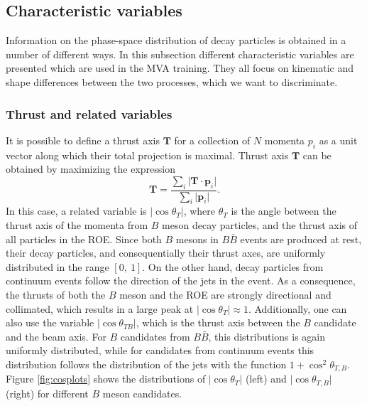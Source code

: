\subsection{Characteristic variables}
\label{ss:charvar}
Information on the phase-space distribution of decay particles is obtained in a number of different ways. In this subsection different characteristic variables are presented which are used in the MVA training. They all focus on kinematic and shape differences between the two processes, which we want to discriminate. 


\subsubsection{Thrust and related variables}
It is possible to define a thrust axis $\mathbf{T}$ for a collection of $N$ momenta $p_i$ as a unit vector along which their total projection is maximal. Thrust axis $\mathbf T$ can be obtained by maximizing the expression
\begin{equation}
\mathbf{T} = \frac{\sum_{i}\vert \mathbf{T} \cdot \mathbf{p}_i\vert}{\sum_{i}\vert \mathbf{p}_i\vert}.
\end{equation}
In this case, a related variable is $\vert \cos\theta_T\vert$, where $\theta_T$ is the angle between the thrust axis of the momenta from $B$ meson decay particles, and the thrust axis of all particles in the ROE. Since both $B$ mesons in $B \bar B$ events are produced at rest, their decay particles, and consequentially their thrust axes, are uniformly distributed in the range $[0,~1]$. On the other hand, decay particles from continuum events follow the direction of the jets in the event. As a consequence, the thrusts of both the $B$ meson and the ROE are strongly directional and collimated, which results in a large peak at $\vert \cos\theta_T\vert \approx 1$. Additionally, one can also use the variable $\vert \cos\theta_{TB}\vert $, which is the thrust axis between the $B$ candidate and the beam axis. For $B$ candidates from $B \bar B$, this distributions is again uniformly distributed, while for candidates from continuum events this distribution follows the distribution of the jets with the function $1+\cos^2\theta_{T,B}$. Figure \ref{fig:cosplots} shows the distributions of $\vert \cos\theta_T\vert$ (left) and $\vert \cos\theta_{T,B}\vert$ (right) for different $B$ meson candidates.

